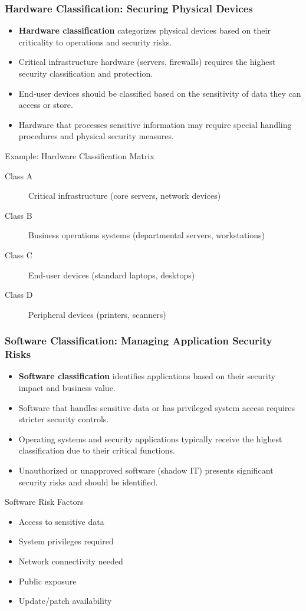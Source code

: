 \documentclass{beamer}
\begin{document}
\begin{frame}
\frametitle{Hardware Classification: Securing Physical Devices}
\begin{itemize}
\item \textbf{Hardware classification} categorizes physical devices based on their criticality to operations and security risks.
\item Critical infrastructure hardware (servers, firewalls) requires the highest security classification and protection.
\item End-user devices should be classified based on the sensitivity of data they can access or store.
\item Hardware that processes sensitive information may require special handling procedures and physical security measures.
\end{itemize}

\begin{exampleblock}{Example: Hardware Classification Matrix}
\begin{description}
\item[Class A] Critical infrastructure (core servers, network devices)
\item[Class B] Business operations systems (departmental servers, workstations)
\item[Class C] End-user devices (standard laptops, desktops)
\item[Class D] Peripheral devices (printers, scanners)
\end{description}
\end{exampleblock}
\end{frame}

\begin{frame}
\frametitle{Software Classification: Managing Application Security Risks}
\begin{itemize}
\item \textbf{Software classification} identifies applications based on their security impact and business value.
\item Software that handles sensitive data or has privileged system access requires stricter security controls.
\item Operating systems and security applications typically receive the highest classification due to their critical functions.
\item Unauthorized or unapproved software (shadow IT) presents significant security risks and should be identified.
\end{itemize}

\begin{block}{Software Risk Factors}
    \small
\begin{itemize}
\item Access to sensitive data
\item System privileges required
\item Network connectivity needed
\item Public exposure
\item Update/patch availability
\end{itemize}
\end{block}
\end{frame}
\end{document}
